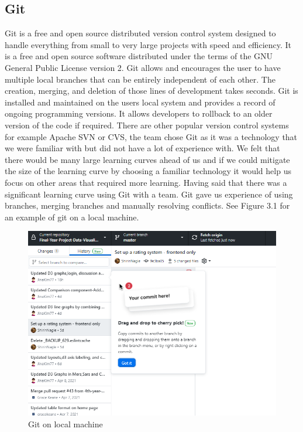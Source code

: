 \subsection{Git}
Git is a free and open source distributed version control system designed to handle everything from small to very large projects with speed and efficiency. It is a free and open source software distributed under the terms of the GNU General Public License version 2.
Git allows and encourages the user to have multiple local branches that can be entirely independent of each other. The creation, merging, and deletion of those lines of development takes seconds.\cite{git}
Git is installed and maintained on the users local system and provides a record of ongoing programming versions. It allows developers to rollback to an older version of the code if required.
There are other popular version control systems for example Apache SVN or CVS, the team chose Git as it was a technology that we were familiar with but did not have a lot of experience with. We felt that there would be many large learning curves ahead of us and if we could mitigate the size of the learning curve by choosing a familiar technology it would help us focus on other areas that required more learning. Having said that there was a significant learning curve using Git with a team. Git gave us experience of using branches, merging branches and manually resolving conflicts. See Figure 3.1 for an example of git on a local machine.
\begin{figure}[H]
    \centering
    \includegraphics[scale=0.5]{img/git.PNG}
    \caption{Git on local machine}
    \label{fig:my_label01}
\end{figure}



